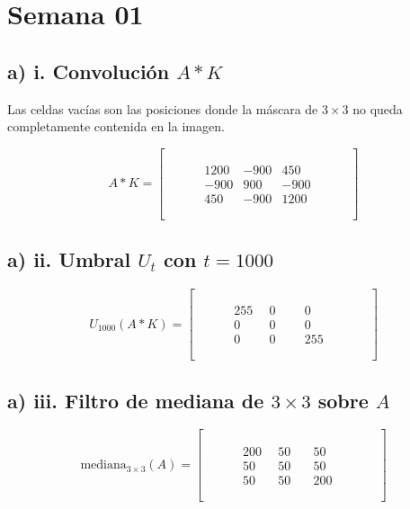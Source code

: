 \documentclass[12pt, a4paper]{article}
\newcommand{\vacia}{\phantom{0000}}
\begin{document}
\section{Semana 01}

\subsection{a) i. Convolución $A * K$}

Las celdas vacías son las posiciones donde la máscara de $3 \times 3$ no queda completamente contenida en la imagen.

\[
A * K =
\begin{bmatrix}
\vacia & \vacia & \vacia & \vacia & \vacia \\
\vacia & 1200 & -900 & 450 & \vacia \\
\vacia & -900 & 900 & -900 & \vacia \\
\vacia & 450 & -900 & 1200 & \vacia \\
\vacia & \vacia & \vacia & \vacia & \vacia
\end{bmatrix}
\]

\subsection{a) ii. Umbral $U_t$ con $t = 1000$}

\[
U_{1000}(A * K) =
\begin{bmatrix}
\vacia & \vacia & \vacia & \vacia & \vacia \\
\vacia & 255 & 0 & 0 & \vacia \\
\vacia & 0 & 0 & 0 & \vacia \\
\vacia & 0 & 0 & 255 & \vacia \\
\vacia & \vacia & \vacia & \vacia & \vacia
\end{bmatrix}
\]

\subsection{a) iii. Filtro de mediana de $3 \times 3$ sobre $A$}

\[
\text{mediana}_{3\times3}(A) =
\begin{bmatrix}
\vacia & \vacia & \vacia & \vacia & \vacia \\
\vacia & 200 & 50 & 50 & \vacia \\
\vacia & 50 & 50 & 50 & \vacia \\
\vacia & 50 & 50 & 200 & \vacia \\
\vacia & \vacia & \vacia & \vacia & \vacia
\end{bmatrix}
\]
\end{document}
